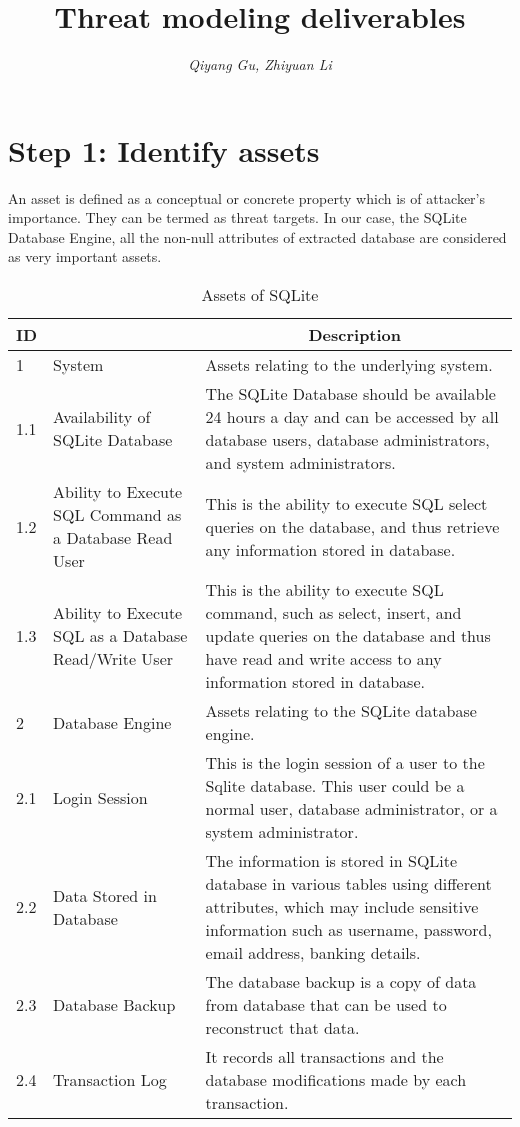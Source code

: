 \documentclass[a4paper, 11pt]{article}
\begin{document}
\title{\textbf{Threat modeling deliverables}}
\author{\textit{Qiyang Gu, Zhiyuan Li}}
\date{}
\maketitle


\section*{Step 1: Identify assets}
An asset is defined as a conceptual or concrete property which is of attacker’s importance. They can be termed as threat targets. In our case, the SQLite Database Engine, all the non-null attributes of extracted database are considered as very important assets. 

\begin{table}[htbp]

\centering
\begin{tabular}{| m{1cm} || >{\raggedright}m{4cm} || m{12cm} |}    
\hline
\multicolumn{1}{|c||}{ID} & \multicolumn{1}{c||}{Name} & \multicolumn{1}{c|}{Description} \\
\hline
1 & System & Assets relating to the underlying system. \\
\hline
1.1 & Availability of SQLite Database & The SQLite Database should be available 24 hours a day and can be accessed by all database users, database administrators, and system administrators. \\
\hline
1.2 & Ability to Execute SQL Command as a Database Read User & This is the ability to execute SQL select queries on the database, and thus retrieve any information stored in database. \\
\hline
1.3 & Ability to Execute SQL as a Database Read/Write User & This is the ability to execute SQL command, such as select, insert, and update queries on the database and thus have read and write access to any information stored in database. \\
\hline
2 & Database Engine & Assets relating to the SQLite database engine. \\
\hline
2.1 & Login Session & This is the login session of a user to the Sqlite database. This user could be a normal user, database administrator, or a system administrator. \\
\hline
2.2 & Data Stored in Database & The information is stored in SQLite database in various tables using different attributes, which may include sensitive information such as username, password, email address, banking details. \\
\hline
2.3 & Database Backup & The database backup is a copy of data from database that can be used to reconstruct that data. \\
\hline
2.4 & Transaction Log & It records all transactions and the database modifications made by each transaction. \\
\hline
\end{tabular}
\caption{Assets of SQLite}
\end{table}
\end{document}
